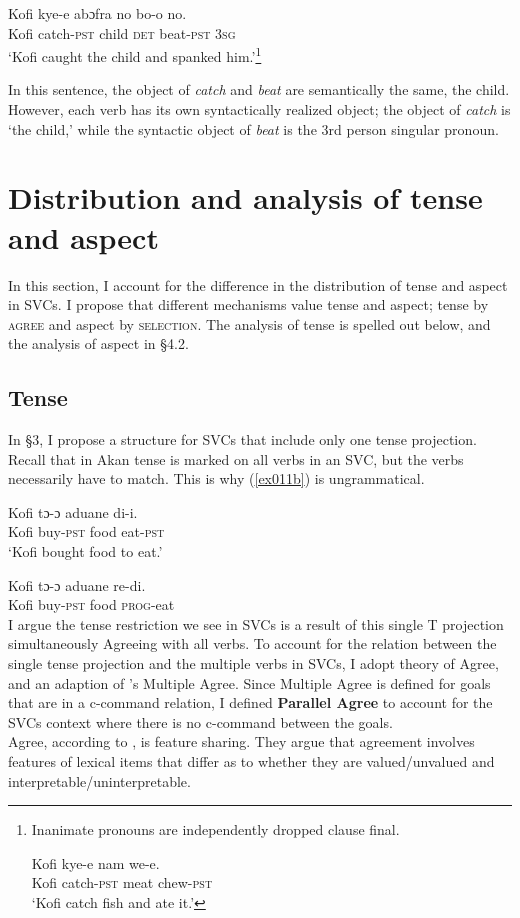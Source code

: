\documentclass[output=paper,colorlinks,citecolor=brown]{langscibook}
\begin{document}
\ea \label{ex28}  \gll  Kofi kye-e abɔfra no bo-o no.\\
	Kofi catch-\textsc{pst} child \textsc{det} beat-\textsc{pst} 3\textsc{sg}\\
\glt`Kofi caught the child and spanked him.'\footnote{Inanimate pronouns are independently dropped clause final.

\ea \gll  Kofi kye-e nam we-e.\\
	Kofi catch-\textsc{pst} meat chew-\textsc{pst}\\
\glt`Kofi catch fish and ate it.'
\z }

\z In this sentence, the object of \emph{catch} and \emph{beat} are semantically the same, the child. However, each verb has its own syntactically realized object; the object of \emph{catch} is `the child,' while the syntactic object of \emph{beat} is the 3rd person singular pronoun. 

 
\section{Distribution and analysis of tense and aspect} 
In this section, I account for the difference in the distribution of tense and aspect in SVCs. I propose that different mechanisms value tense and aspect;   tense by \textsc{agree}  and aspect by \textsc{selection}. The analysis of tense is spelled out below, and the analysis of aspect in \S4.2. 

\subsection{Tense}
In \S3, I propose a structure for SVCs that include only one tense projection.  Recall that in Akan tense is marked on all verbs in an SVC, but the verbs necessarily have to match. This is why (\ref{ex011b}) is ungrammatical. 

\ea \label{ex011}
\ea \label{ex011a} \gll Kofi tɔ-ɔ aduane di-i.\\
	Kofi buy-\textsc{pst} food eat-\textsc{pst}\\
	\glt `Kofi bought food to eat.'
    
    \ex\label{ex011b} \gll * Kofi tɔ-ɔ aduane re-di.\\
	{} Kofi buy-\textsc{pst} food \textsc{prog}-eat\\
	
 \z \z I argue the tense restriction we see in SVCs is a result of this single T projection simultaneously Agreeing with all verbs. To account for the relation between the single tense projection and the multiple verbs in SVCs, I adopt  theory of Agree, and an adaption of \citeauthor{Hiraiwa2001}'s \citeyearpar{Hiraiwa2001} Multiple Agree. Since Multiple Agree is defined for goals that are in a c-command relation, I defined  \textbf{Parallel Agree} to account for the SVCs context where there is no c-command between the goals.\\ Agree, according to \citet{PesetskyTorrego2007},  is feature sharing. They argue that agreement involves features of lexical items that differ as to whether they are valued/unvalued and interpretable/uninterpretable.  
  
\end{document}
